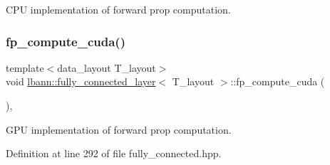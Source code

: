 C\+PU implementation of forward prop computation. \mbox{\label{classlbann_1_1fully__connected__layer_a720c048ee32b5620a99886177be4f577}} 
\subsubsection{\texorpdfstring{fp\+\_\+compute\+\_\+cuda()}{fp\_compute\_cuda()}}
{\footnotesize\ttfamily template$<$data\+\_\+layout T\+\_\+layout$>$ \\
void \hyperlink{classlbann_1_1fully__connected__layer}{lbann\+::fully\+\_\+connected\+\_\+layer}$<$ T\+\_\+layout $>$\+::fp\+\_\+compute\+\_\+cuda (\begin{DoxyParamCaption}{ }\end{DoxyParamCaption})\hspace{0.3cm}{\ttfamily [inline]}, {\ttfamily [private]}}

G\+PU implementation of forward prop computation. 

Definition at line 292 of file fully\+\_\+connected.\+hpp.


